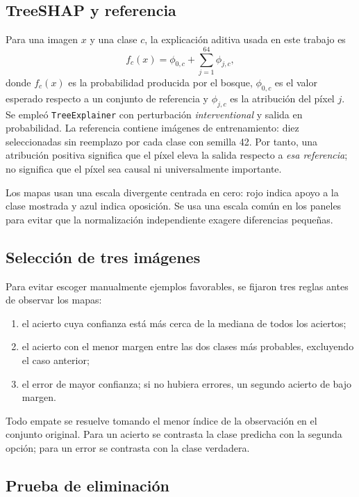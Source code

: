 \documentclass[11pt,letterpaper]{article}
\begin{document}
\subsection{TreeSHAP y referencia}

Para una imagen $x$ y una clase $c$, la explicación aditiva usada en este trabajo es
\begin{equation}
  f_c(x) = \phi_{0,c} + \sum_{j=1}^{64}\phi_{j,c},
  \label{eq:additivity}
\end{equation}
donde $f_c(x)$ es la probabilidad producida por el bosque, $\phi_{0,c}$ es el valor
esperado respecto a un conjunto de referencia y $\phi_{j,c}$ es la atribución del
píxel $j$. Se empleó \texttt{TreeExplainer} con perturbación
\emph{interventional} y salida en probabilidad. La referencia
contiene \BackgroundSize{} imágenes de entrenamiento: diez seleccionadas sin reemplazo
por cada clase con semilla 42. Por tanto, una atribución positiva significa que el
píxel eleva la salida respecto a \emph{esa referencia}; no significa que el píxel sea
causal ni universalmente importante.

Los mapas usan una escala divergente centrada en cero: rojo indica apoyo a la clase
mostrada y azul indica oposición. Se usa una escala común en los paneles para evitar
que la normalización independiente exagere diferencias pequeñas.

\subsection{Selección de tres imágenes}

Para evitar escoger manualmente ejemplos favorables, se fijaron tres reglas antes de
observar los mapas:
\begin{enumerate}
  \item el acierto cuya confianza está más cerca de la mediana de todos los aciertos;
  \item el acierto con el menor margen entre las dos clases más probables, excluyendo
  el caso anterior;
  \item el error de mayor confianza; si no hubiera errores, un segundo acierto de bajo
  margen.
\end{enumerate}
Todo empate se resuelve tomando el menor índice de la observación en el conjunto
original.
Para un acierto se contrasta la clase predicha con la segunda opción; para un error se
contrasta con la clase verdadera.

\subsection{Prueba de eliminación}
\end{document}
